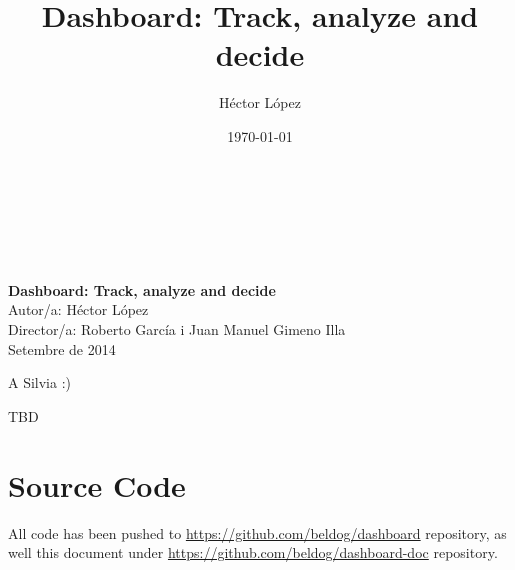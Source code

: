\documentclass[a4paper,12pt,english]{book}
\newenvironment{dedication}
{
   \cleardoublepage
   \thispagestyle{empty}
   \vspace*{\stretch{1}}
   \hfill\begin{minipage}[t]{0.15\textwidth}
   \raggedright
}%
{
   \end{minipage}
   \vspace*{\stretch{3}}
   \clearpage
}
\begin{document}
\clearpage\thispagestyle{empty}

\begin{framed}
\\
\\
\\ 
\\
\textbf{Dashboard: Track, analyze and decide}\\

\raggedleft
Autor/a: Héctor López\\
Director/a: Roberto García i Juan Manuel Gimeno Illa\\
Setembre de 2014
\end{framed}

\title{Dashboard: Track, analyze and decide}
\author{Héctor López}

\date{\today}

\begin{dedication}
A Silvia :)
\end{dedication}

%

\tableofcontents


TBD \\

\chapter*{Source Code}
All code has been pushed to \url{https://github.com/beldog/dashboard}
repository, as well this document under \url{https://github.com/beldog/dashboard-doc} repository.

%
%




\end{document}
